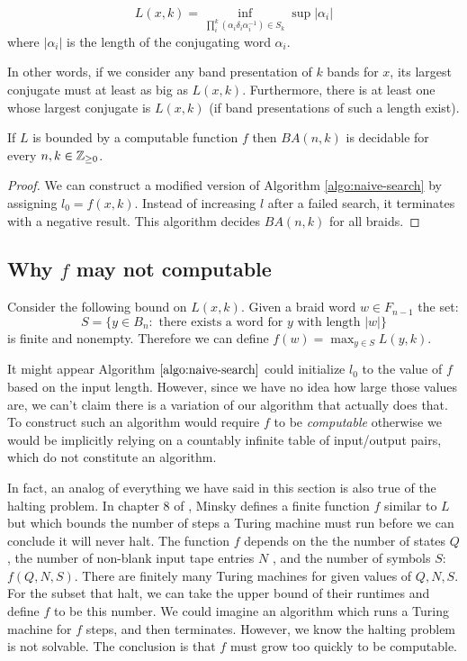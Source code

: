 \documentclass[12pt]{thesis}
\begin{document}
    \begin{equation}
        L(x, k) = \inf_{\prod_{i}^{k} (\alpha_{i} \delta_{i} \alpha_{i}^{-1}) \in S_{k}} \sup |\alpha_{i}|
    \end{equation}
    where $|\alpha_{i}|$ is the length of the conjugating word $\alpha_{i}$.

    In other words, if we consider any band presentation of $k$ bands for $x$,
    its largest conjugate must at least as big as $L(x, k)$.
    Furthermore, there is at least one whose largest conjugate is $L(x, k)$ (if band presentations of such a length exist).

\begin{theorem}
    \label{th:decidable}
    If $L$ is bounded by a computable function $f$ then $BA(n, k)$ is decidable
    for every $n, k \in \mathbb{Z}_{\geq 0}$.
\end{theorem}

\begin{proof}
    We can construct a modified version of Algorithm \ref{algo:naive-search}
    by assigning $l_{0} = f(x, k)$.
    Instead of increasing $l$ after a failed search,
    it terminates with a negative result.
    This algorithm decides $BA(n, k)$ for all braids.
\end{proof}

\subsection{Why $f$ may not computable}

Consider the following bound on $L(x, k)$.
Given a braid word $w \in F_{n-1}$ 
the set: 
\[
    S = \{ y \in B_{n} \colon \text{ there exists a word for $y$ with length } |w| \}
\] is finite and nonempty.
Therefore we can define $f(w) = \max_{y \in S} L(y, k)$.

It might appear Algorithm $\ref{algo:naive-search}$ could initialize $l_{0}$ 
to the value of $f$ based on the input length.
However, since we have no idea how large those values are, we can't claim
there is a variation of our algorithm that 
actually does that.
To construct such an algorithm would require $f$ to be \textit{computable}
otherwise we would be implicitly relying  on a countably infinite table of input/output pairs,
which do not constitute an algorithm.

In fact, an analog of everything we have
said in this section is also true of the halting problem.
In chapter 8 of \cite{computation},
Minsky defines a finite function $f$ similar 
to $L$ but which bounds the number of steps a Turing machine must run
before we can conclude it will never halt.
The function $f$ depends on the the number of states $Q$, 
the number of non-blank input tape entries $N$ ,
and the number of symbols $S$: $f(Q, N, S)$.
There are finitely many Turing machines 
for given values of $Q, N, S$. 
For the subset that halt, we can take the upper bound of their
runtimes and define $f$ to be this number.
We could imagine an algorithm which runs a Turing machine for $f$ steps,
and then terminates.
However, we know the halting problem is not solvable.
The conclusion is that $f$ must grow too quickly to be computable.
\end{document}
